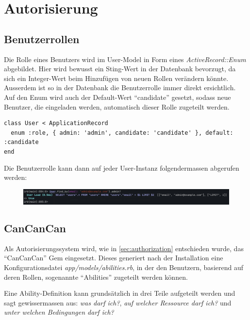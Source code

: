 \section{Autorisierung}

\subsection{Benutzerrollen}

Die Rolle eines Benutzers wird im User-Model in Form eines \emph{ActiveRecord::Enum} abgebildet. Hier wird bewusst ein Sting-Wert in der Datenbank
bevorzugt, da sich ein Integer-Wert beim Hinzufügen von neuen Rollen verändern könnte. Ausserdem ist so in der Datenbank die Benutzerrolle immer
direkt ersichtlich. Auf den Enum wird auch der Default-Wert \enquote{candidate} gesetzt, sodass neue Benutzer, die eingeladen werden, automatisch dieser Rolle zugeteilt werden. 

\begin{codebox}
\begin{verbatim}
class User < ApplicationRecord
  enum :role, { admin: 'admin', candidate: 'candidate' }, default: :candidate
end
\end{verbatim}
\end{codebox}

Die Benutzerrolle kann dann auf jeder User-Instanz folgendermassen abgerufen werden:

\begin{figure}[H]
  \centering
  \includegraphics[width=\textwidth]{images/enum.png}
\end{figure}

\subsection{CanCanCan}

Als Autorisierungssystem wird, wie in \ref{sec:authorization} entschieden wurde, das \enquote{CanCanCan} Gem eingesetzt.
Dieses generiert nach der Installation eine Konfigurationsdatei \emph{app/models/abilities.rb}, in der
den Benutzern, basierend auf deren Rollen, sogenannte \enquote{Abilities} zugeteilt werden können.

Eine Ability-Definition kann grundsätzlich in drei Teile aufgeteilt werden und sagt gewissermassen aus: 
\emph{was darf ich?}, \emph{auf welcher Ressource darf ich?} und \emph{unter welchen Bedingungen darf ich?}


